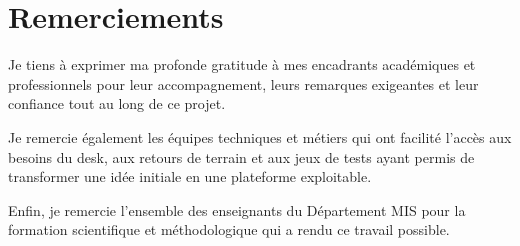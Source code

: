 ﻿\chapter*{Remerciements}

Je tiens à exprimer ma profonde gratitude à mes encadrants académiques et
professionnels pour leur accompagnement, leurs remarques exigeantes et leur
confiance tout au long de ce projet.

Je remercie également les équipes techniques et métiers qui ont facilité
l'accès aux besoins du desk, aux retours de terrain et aux jeux de tests ayant
permis de transformer une idée initiale en une plateforme exploitable.

Enfin, je remercie l'ensemble des enseignants du Département MIS pour la
formation scientifique et méthodologique qui a rendu ce travail possible.

\cleardoublepage

